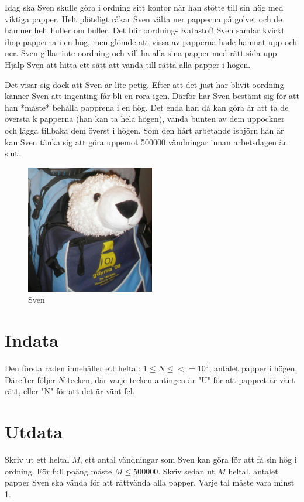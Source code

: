 Idag ska Sven skulle göra i ordning sitt kontor när han stötte till sin hög med viktiga papper.
Helt plötsligt råkar Sven välta ner papperna på golvet och de hamner helt huller om buller. Det blir oordning- Katastof!
Sven samlar kvickt ihop papperna i en hög, men glömde att vissa av papperna hade hamnat upp och ner.
Sven gillar inte oordning och vill ha alla sina papper med rätt sida upp.
Hjälp Sven att hitta ett sätt att vända till rätta alla papper i högen.

Det visar sig dock att Sven är lite petig.
Efter att det just har blivit oordning känner Sven att ingenting får bli en röra igen.
Därför har Sven bestämt sig för att han *måste* behålla papprena i en hög.
Det enda han då kan göra är att ta de översta k papperna (han kan ta hela högen), vända bunten av dem uppockner och lägga tillbaka dem överst i högen.
Som den hårt arbetande isbjörn han är kan Sven tänka sig att göra uppemot 500000 vändningar innan arbetsdagen är slut.

\begin{figure}[h]
	\centering
\includegraphics[width=0.5\textwidth]{sven}
\caption{Sven}
\end{figure}

\section*{Indata}
Den första raden innehåller ett heltal: $1\leq N \leq <= 10^5$, antalet papper i högen.
Därefter följer $N$ tecken, där varje tecken antingen är "U" för att pappret är vänt rätt, eller "N" för att det är vänt fel. 

\section*{Utdata}
Skriv ut ett heltal $M$, ett antal vändningar som Sven kan göra för att få sin hög i ordning. För full poäng måste  $M \leq 500000$.
Skriv sedan ut $M$ heltal, antalet papper Sven ska vända för att rättvända alla papper. Varje tal måste vara minst 1.

